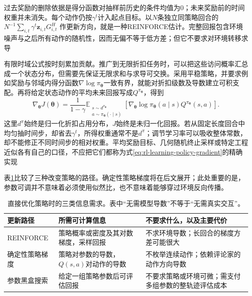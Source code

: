 过去奖励的删除依据是得分函数对抽样前历史的条件均值为0；未来奖励前的时间权重并未消失。每个动作仍按$\gamma^t$计入起点目标。以$N$条独立同策略回合的
$N^{-1}\sum_{i,t}\gamma^t\bm{z}_{i,t}G_{i,t}^H$
作更新方向，就是一种REINFORCE估计。完整回报包含环境噪声与之后所有动作的随机性，因而无偏不等于低方差；但它不要求对环境转移求导

有限时域公式按时刻累加贡献。推广到无限折扣任务时，可以把这些访问概率汇总成一个状态分布，但需要先保证无限求和与求导可交换。采用平稳策略，并要求例如奖励与邻域内得分函数$\nabla\log\pi_{\bm\theta}$一致有界，就能对折扣级数及导数建立可积支配。再将给定状态动作的平均未来回报写成$Q^{\pi_{\bm\theta}}$，得到
\begin{equation}
  \nabla_{\bm\theta}J(\bm\theta)
    =\frac{1}{1-\gamma}
      \mathbb E_{\substack{s\sim d^{\pi_{\bm\theta}}\\
                           a\sim\pi_{\bm\theta}(\cdot\mid s)}}
        \left[\nabla_{\bm\theta}\log\pi_{\bm\theta}(a\mid s)
              Q^{\pi_{\bm\theta}}(s,a)\right].
  \label{eq:rl-learning-policy-gradient}
\end{equation}
这里$d^\pi$始终是归一化折扣占用分布，$J$始终是未归一化回报。若从固定长度回合中均匀抽时间步，却省去$\gamma^t$，所得权重通常不是$d^\pi$；调节学习率可以吸收整体常数，却不能修正不同时间步的相对权重。平均奖励目标、几何随机终止采样或特定工程近似各有自己的口径，不应把它们都称为式\eqref{eq:rl-learning-policy-gradient}的精确实现

表\ref{tab:rl-learning-policy-search-information}比较了三种改变策略的路径。确定性策略梯度将在后文展开；此处重要的是，参数可调并不意味着必须使用似然比，也不意味着能够穿过环境反向传播。

\begin{table}[t]
  \centering
  \small
  \begin{tabularx}{\linewidth}{>{\raggedright\arraybackslash}p{29mm} >{\raggedright\arraybackslash}X >{\raggedright\arraybackslash}X}
    \toprule
    更新路径 & 所需可计算信息 & 不要求什么，以及主要代价 \\
    \midrule
    REINFORCE & 策略概率或密度及其对数梯度，采样回报 & 不求环境导数；长回合的梯度方差可能很大 \\
    确定性策略梯度 & 策略对参数的导数，$Q(s,a)$对动作的导数 & 不枚举连续动作；依赖评论家的动作方向导数 \\
    参数黑盒搜索 & 给定一组策略参数后可评估回报 & 不要求策略或环境可微；需支付多组参数的整轨迹评估成本 \\
    \bottomrule
  \end{tabularx}
  \caption{直接优化策略时的三类信息需求。表中“无需模型导数”不等于“无需真实交互”。}
  \label{tab:rl-learning-policy-search-information}
\end{table}

